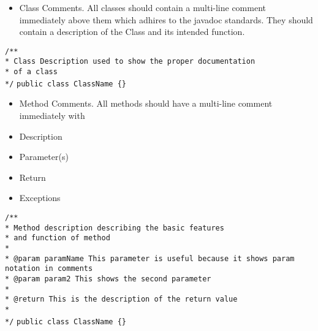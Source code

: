 \documentclass{scrreprt}
\begin{document}
\begin{itemize}
\item Class Comments. All classes should contain a multi-line comment immediately above them which adhires to 
the javadoc standards. They should contain a description of the Class and its intended function. \\
\end{itemize}

\texttt{/** \\}
\texttt{* Class Description used to show the proper documentation \\}
\texttt{* of a class \\}
\texttt{*/}
\texttt{public class ClassName \{\}}

\begin{itemize}
\item Method Comments. All methods should have a multi-line comment immediately with
\item Description
\item Parameter(s)
\item Return
\item Exceptions
\end{itemize}

\texttt{/** \\}
\texttt{* Method description describing the basic features \\}
\texttt{* and function of method\\}
\texttt{* \\}
\texttt{* @param paramName This parameter is useful because it shows param notation in comments \\}
\texttt{* @param param2 This shows the second parameter \\}
\texttt{* \\}
\texttt{* @return This is the description of the return value\\}
\texttt{* \\}
\texttt{*/}
\texttt{public class ClassName \{\}}
\end{document}
